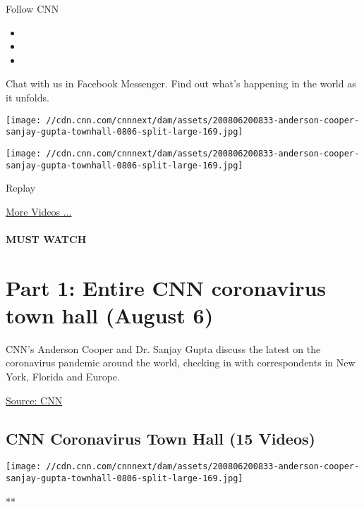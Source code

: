 Follow CNN

\begin{itemize}
\item
\item
\item
\end{itemize}

Chat with us in Facebook Messenger. Find out what's happening in the
world as it unfolds.

\texttt{[image: //cdn.cnn.com/cnnnext/dam/assets/200806200833-anderson-cooper-sanjay-gupta-townhall-0806-split-large-169.jpg]}

\texttt{[image: //cdn.cnn.com/cnnnext/dam/assets/200806200833-anderson-cooper-sanjay-gupta-townhall-0806-split-large-169.jpg]}\href{javascript:void(0);}{}

Replay

\href{/videos}{More Videos ...}

\hypertarget{must-watch}{%
\paragraph{MUST WATCH}\label{must-watch}}

\hypertarget{part-1-entire-cnn-coronavirus-town-hall-august-6}{%
\section{Part 1: Entire CNN coronavirus town hall (August
6)}\label{part-1-entire-cnn-coronavirus-town-hall-august-6}}

CNN's Anderson Cooper and Dr. Sanjay Gupta discuss the latest on the
coronavirus pandemic around the world, checking in with correspondents
in New York, Florida and Europe.

\href{https://www.cnn.com/}{Source: CNN}

\hypertarget{cnn-coronavirus-town-hall-15-videos}{%
\subsection{CNN Coronavirus Town Hall (15
Videos)}\label{cnn-coronavirus-town-hall-15-videos}}

\href{/videos/health/2020/08/06/entire-august-6-coronavirus-town-hall-part-1-sot-vpx.cnn}{}

\texttt{[image: //cdn.cnn.com/cnnnext/dam/assets/200806200833-anderson-cooper-sanjay-gupta-townhall-0806-split-large-169.jpg]}

**

